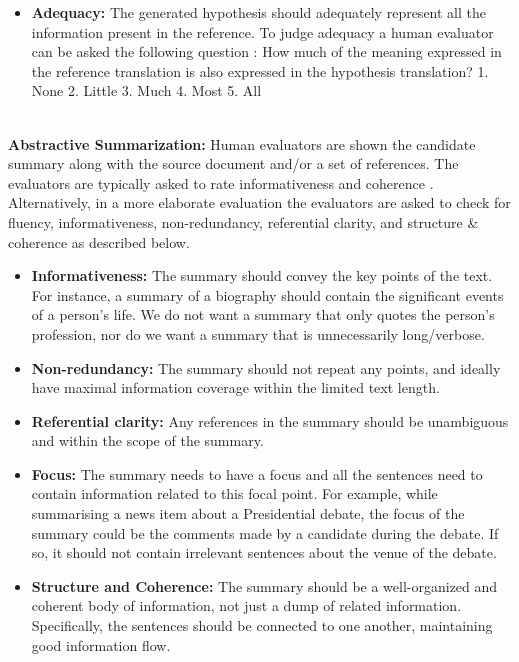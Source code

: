 \begin{itemize}
    \item \textbf{Adequacy:} The generated hypothesis should adequately represent all the information present in the reference. To judge adequacy a human evaluator can be asked the following question : How much of the meaning expressed in the reference translation is also expressed in the hypothesis translation? 1. None 2. Little 3. Much 4. Most 5. All
\end{itemize}
~\\
\textbf{Abstractive Summarization:} Human evaluators are shown the candidate summary along with the source document and/or a set of references. The evaluators are typically asked to rate informativeness and coherence . 
Alternatively, in a more elaborate evaluation the evaluators are asked to check for fluency, informativeness, non-redundancy, referential clarity, and structure \& coherence  as described below. 
\begin{itemize}
    \item \textbf{Informativeness:} The summary should convey the key points of the text. 
    For instance, a summary of a biography should contain the significant events of a person's life. We do not want a summary that only quotes the person's profession, nor do we want a summary that is unnecessarily long/verbose.
    \item \textbf{Non-redundancy:} The summary should not repeat any points, and ideally have maximal information coverage within the limited text length.
    \item \textbf{Referential clarity:} Any  references in the summary should be unambiguous and within the scope of the summary.  
    \item \textbf{Focus:} The summary needs to have a focus and all the sentences need to contain information related to this focal point. For example, while summarising a news item about a Presidential debate, the focus of the summary could be the comments made by a candidate during the debate. If so, it should not contain irrelevant sentences about the venue of the debate.
    \item \textbf{Structure and Coherence:} The summary should be a well-organized and coherent body of information, not just a dump of related information. Specifically, the sentences should be connected to one another, maintaining good information flow.
\end{itemize}
